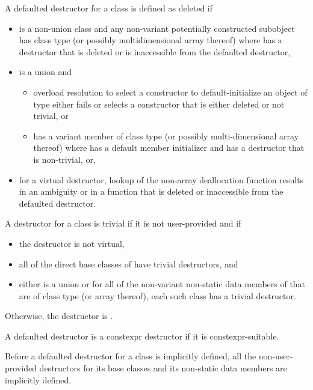 \pnum
A defaulted destructor for a class
   is defined as deleted if
\begin{itemize}
\item {} is a non-union class and
  any non-variant potentially constructed subobject has class type
   (or possibly multidimensional array thereof) where
   has a destructor that is deleted or
  is inaccessible from the defaulted destructor,

\item
   is a union and
  \begin{itemize}
  \item
    overload resolution to select a constructor to
    default-initialize an object of type  either fails or
    selects a constructor that is either deleted or not trivial, or
  \item
     has a variant member  of
    class type  (or possibly multi-dimensional array thereof)
    where  has a default member initializer and
     has a destructor that is non-trivial, or,
  \end{itemize}

\item for a virtual destructor, lookup of the non-array deallocation
  function results in an ambiguity or in a function that is deleted or
  inaccessible from the defaulted destructor.
\end{itemize}

\pnum
A destructor for a class  is trivial if it is not user-provided and if
\begin{itemize}
\item the destructor is not virtual,

\item all of the direct base classes of  have trivial destructors, and

\item either  is a union or
for all of the non-variant non-static data members of  that are of class
type (or array thereof), each such class has a trivial destructor.
\end{itemize}

Otherwise, the destructor is
.

\pnum
A defaulted destructor is a constexpr destructor
if it is constexpr-suitable.

\pnum
Before a
defaulted destructor for a class is implicitly defined, all the non-user-provided
destructors for its base classes and its non-static data members are
implicitly defined.

